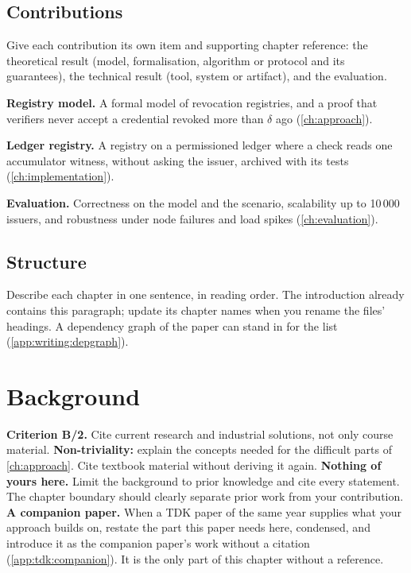 \subsection[Contributions]{Contributions\skimmark}\label{app:chapters:contributions}
Give each contribution its own item and supporting chapter reference: the theoretical result (model, formalisation, algorithm or protocol and its guarantees), the technical result (tool, system or artifact), and the evaluation.
\begin{contributions}
  \item\label{c:guide:model} \textbf{Registry model.} A formal model of revocation registries, and a proof that verifiers never accept a credential revoked more than $\delta$ ago (\cref{ch:approach}).
  \item\label{c:guide:registry} \textbf{Ledger registry.} A registry on a permissioned ledger where a check reads one accumulator witness, without asking the issuer, archived with its tests (\cref{ch:implementation}).
  \item\label{c:guide:eval} \textbf{Evaluation.} Correctness on the model and the scenario, scalability up to 10\,000 issuers, and robustness under node failures and load spikes (\cref{ch:evaluation}).
\end{contributions}

\subsection{Structure}\label{app:chapters:structure}
Describe each chapter in one sentence, in reading order. The introduction already contains this paragraph; update its chapter names when you rename the files' headings. A dependency graph of the paper can stand in for the list (\cref{app:writing:depgraph}).

\section{Background}\label{app:chapters:background}
\textbf{Criterion B/2.} Cite current research and industrial solutions, not only course material.
\textbf{Non-triviality:} explain the concepts needed for the difficult parts of \cref{ch:approach}. Cite textbook material without deriving it again.
\textbf{Nothing of yours here.} Limit the background to prior knowledge and cite every statement. The chapter boundary should clearly separate prior work from your contribution.
\textbf{A companion paper.} When a TDK paper of the same year supplies what your approach builds on, restate the part this paper needs here, condensed, and introduce it as the companion paper's work without a citation (\cref{app:tdk:companion}). It is the only part of this chapter without a reference.

